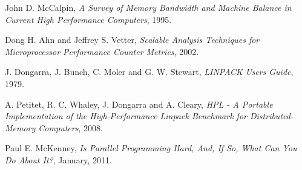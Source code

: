 \documentclass[a4paper]{report}
\begin{document}
\begin{thebibliography}{9}
  John D. McCalpin,
  \emph{A Survey of Memory Bandwidth and Machine Balance in Current High Performance Computers},
  1995.
  
  Dong H. Ahn and Jeffrey S. Vetter,
  \emph{Scalable Analysis Techniques for Microprocessor Performance Counter Metrics},
  2002.
  
  J. Dongarra, J. Bunch, C. Moler and G. W. Stewart, 
  \emph{LINPACK Users Guide},
  1979.
  
  A. Petitet, R. C. Whaley, J. Dongarra and A. Cleary, 
  \emph{HPL - A Portable Implementation of the High-Performance Linpack Benchmark for Distributed-Memory Computers},
  2008.
  
  Paul E. McKenney,
  \emph{Is Parallel Programming Hard, And, If So, What Can You Do About It?},
  January, 2011.

\end{thebibliography}
\end{document}

